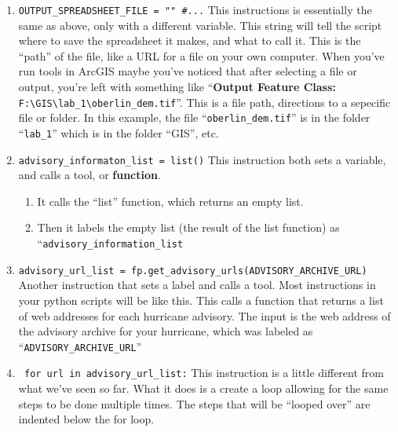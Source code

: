 \documentclass{article}
\begin{document}
\begin{enumerate}
    \item \verb+OUTPUT_SPREADSHEET_FILE = "" #...+ This instructions is essentially the same as above, only with a different variable.  This string will tell the script where to save the spreadsheet it makes, and what to call it.  This is the ``path'' of the file, like a URL for a file on your own computer.  When you've run tools in ArcGIS maybe you've noticed that after selecting a file or output, you're left with something like ``\textbf{Output Feature Class:} \verb+F:\GIS\lab_1\oberlin_dem.tif+''.  This is a file path, directions to a sepecific file or folder.  In this example, the file ``\verb+oberlin_dem.tif+'' is in the folder ``\verb+lab_1+'' which is in the folder ``GIS'', etc.  
    \item \verb+advisory_informaton_list = list()+ This instruction both sets a variable, and calls a tool, or \textbf{function}.
    \begin{enumerate}
        \item It calls the ``list'' function, which returns an empty list. 
        \item Then it labels the empty list (the result of the list function) as ``\verb+advisory_information_list+
    \end{enumerate}
    \item \verb+advisory_url_list = fp.get_advisory_urls(ADVISORY_ARCHIVE_URL)+  Another instruction that sets a label and calls a tool.  Most instructions in your python scripts will be like this.  This calls a function that returns a list of web addresses for each hurricane advisory.  The input is the web address of the advisory archive for your hurricane, which was labeled as ``\verb+ADVISORY_ARCHIVE_URL+''
    \item \verb+ for url in advisory_url_list:+  This instruction is a little different from what we've seen so far.  What it does is a create a loop allowing for the same steps to be done multiple times.  The steps that will be ``looped over'' are indented below the for loop.


\end{enumerate}
\end{document}
